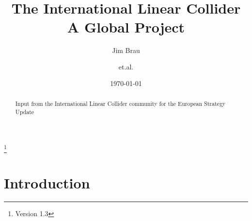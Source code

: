 \documentclass[%
 reprint,
 amsmath,amssymb,
 aps,
]{revtex4-1}
\newcommand{\todo}[1]{\textcolor{red}{{#1}}}
\begin{document}

\title{The International Linear Collider \\ A Global Project}%
\thanks{Version 1.3}%

\author{Jim Brau}
\author{et.al.}%
%


\date{\today}%

\begin{abstract}
Input from the International Linear Collider community for the European Strategy Update 

\end{abstract}

\maketitle


\section{\label{sec:intro}Introduction}

\end{document}
